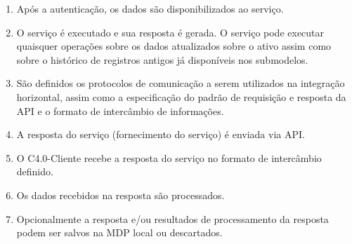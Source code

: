 \begin{enumerate}
		\item Após a autenticação, os dados são disponibilizados ao serviço.
		
		\item O serviço é executado e sua resposta é gerada. O serviço pode executar quaisquer operações sobre os dados atualizados sobre o ativo assim como sobre o histórico de registros antigos já disponíveis nos submodelos.
		
		\item São definidos os protocolos de comunicação a serem utilizados na integração horizontal, assim como a especificação do padrão de requisição e resposta da API e o formato de intercâmbio de informações.
		
		\item A resposta do serviço (fornecimento do serviço) é enviada via API.
		
		\item O C4.0-Cliente recebe a resposta do serviço no formato de intercâmbio definido.
		
		\item Os dados recebidos na resposta são processados.
		
		\item Opcionalmente a resposta e/ou resultados de processamento da resposta podem ser salvos na MDP local ou descartados.
	\end{enumerate}
	